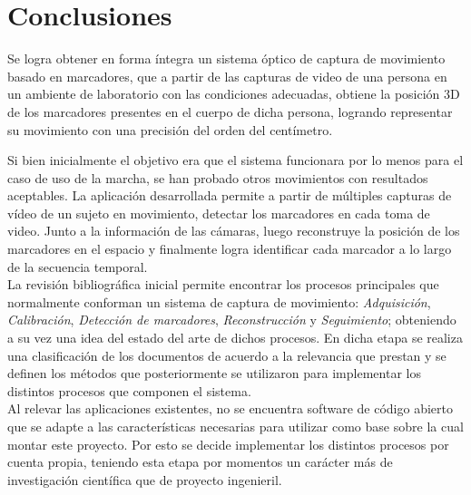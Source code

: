 \chapter{Conclusiones}
\label{conclusiones}



Se logra obtener en forma íntegra un sistema óptico de captura de movimiento basado en marcadores, que a partir de las capturas de video de una persona en un ambiente de laboratorio con las condiciones adecuadas, obtiene la posición 3D de  los marcadores presentes en el cuerpo de dicha persona, logrando representar su movimiento con una precisión del orden del centímetro. 


Si bien inicialmente el objetivo era que el sistema funcionara por lo menos para el caso de uso de la marcha, se han probado otros  movimientos con resultados aceptables. La aplicación desarrollada permite a partir de múltiples capturas de vídeo de un sujeto en movimiento, detectar los marcadores en cada toma de video. Junto a la información de las cámaras, luego reconstruye la posición de los marcadores en el espacio y finalmente logra identificar cada marcador a lo largo de la secuencia temporal.\\ 


La revisión bibliográfica inicial permite encontrar los procesos principales que normalmente conforman un sistema de captura de movimiento: \emph{Adquisición}, \emph{Calibración}, \emph{Detección de marcadores}, \emph{Reconstrucción} y \emph{Seguimiento};  obteniendo a su vez una idea del estado del arte de dichos procesos. En dicha etapa se realiza una clasificación de los documentos de acuerdo a la relevancia que prestan y se definen los métodos que posteriormente se utilizaron para implementar los distintos procesos que componen el sistema. \\  

Al relevar las aplicaciones existentes, no se encuentra software de código abierto que se adapte a las características necesarias para utilizar como base sobre la cual montar este proyecto. Por esto se decide implementar los distintos procesos por cuenta propia, teniendo esta etapa por momentos un carácter más de investigación científica que de proyecto ingenieril.\\

